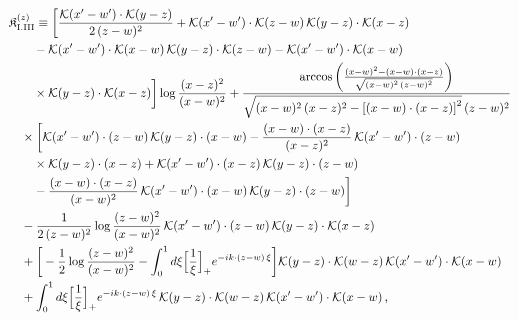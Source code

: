 \begingroup\small
\begin{align}\label{eq:K-z_rm_I_III}
&\mathfrak{K}^{(z)}_{\rm I.III}\equiv \bigg[\frac{\mathcal{K}(x'-w')\cdot\mathcal{K}(y-z)}{2\,(z-w)^{2}} +\mathcal{K}(x'-w')\cdot\mathcal{K}(z-w)\, \mathcal{K}(y-z)\cdot\mathcal{K}(x-z)\notag\\
&\quad\quad -\mathcal{K}(x'-w')\cdot\mathcal{K}(x-w)\, \mathcal{K}(y-z)\cdot\mathcal{K}(z-w) -\mathcal{K}(x'-w')\cdot\mathcal{K}(x-w)\notag\\
&\quad\quad \times \mathcal{K}(y-z)\cdot\mathcal{K}(x-z)\bigg]\log\frac{(x-z)^{2}}{(x-w)^{2}} +\frac{\arccos\left(\frac{(x-w)^{2}-(x-w)\cdot (x-z)}{\sqrt{(x-w)^{2}\,(z-w)^{2}}}\right)}{\sqrt{(x-w)^{2}\,(x-z)^{2}-\left[(x-w)\cdot (x-z)\right]^{2}}\,(z-w)^{2}}\notag\\
&\quad \times \bigg[\mathcal{K}(x'-w')\cdot(z-w)\, \mathcal{K}(y-z)\cdot(x-w) -\frac{(x-w)\cdot(x-z)}{(x-z)^{2}}\, \mathcal{K}(x'-w')\cdot(z-w)\notag\\
&\quad\quad \times \mathcal{K}(y-z)\cdot(x-z) +\mathcal{K}(x'-w')\cdot(x-z)\, \mathcal{K}(y-z)\cdot(z-w)\notag\\
&\quad\quad -\frac{(x-w)\cdot(x-z)}{(x-w)^{2}}\, \mathcal{K}(x'-w')\cdot(x-w)\, \mathcal{K}(y-z)\cdot(z-w)\bigg]\notag\\
&\quad -\frac{1}{2\,(z-w)^{2}}\log\frac{(z-w)^{2}}{(x-w)^{2}}\, \mathcal{K}(x'-w')\cdot(z-w)\, \mathcal{K}(y-z)\cdot\mathcal{K}(x-z)\notag\\
&\quad +\bigg[-\frac{1}{2}\log\frac{(z-w)^{2}}{(x-w)^{2}} - \int_{0}^{1}d\xi\Big[\frac{1}{\xi}\Big]_{+}e^{-ik\cdot(z-w)\,\xi}\bigg]\mathcal{K}(y-z)\cdot\mathcal{K}(w-z)\, \mathcal{K}(x'-w')\cdot\mathcal{K}(x-w)\notag\\
&\quad + \int_{0}^{1}d\xi\Big[\frac{1}{\xi}\Big]_{+}e^{-ik\cdot(z-w)\,\xi}\, \mathcal{K}(y-z)\cdot\mathcal{K}(w-z)\, \mathcal{K}(x'-w')\cdot\mathcal{K}(x-w)\,,
\end{align}
\endgroup
